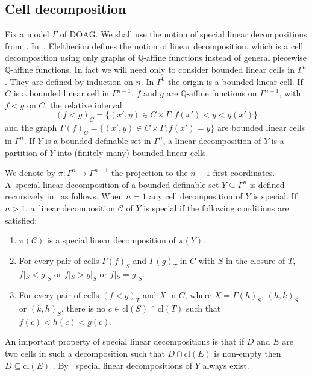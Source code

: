 \documentclass[10pt]{amsart}
\theoremstyle{definition}
\theoremstyle{remark}
\newcommand{\cl}{\mathrm{cl}}
\newcommand{\DOAG}{\mathrm{DOAG}}
\newcommand{\Q}{\mathbb Q}
\theoremstyle{plain}
\theoremstyle{definition}
\begin{document}
\subsection{Cell decomposition}
Fix a model $\Gamma$ of
$\DOAG$.
We shall use the notion
of special linear decompositions from~\cite{elef}. In~\cite{elef}, Eleftheriou defines the notion of linear decomposition, which is a cell decomposition using only
graphs of $\Q$-affine functions instead of general piecewise $\Q$-affine functions. In fact we will need only to consider bounded linear cells in $\Gamma^n$. They are defined by induction on $n$.
In $\Gamma^0$ the origin is a bounded linear cell. If $C$ is a bounded linear cell in $\Gamma^{n-1}$, $f$ and $g$ are $\Q$\nobreakdash-affine functions on $\Gamma^{n-1}$, with $f < g$ on $C$, the relative interval
\[
(f < g)_C = \{(x', y) \in C \times \Gamma; f (x') < y < g(x')\}
\]
and the graph $\Gamma (f)_C = \{(x', y) \in C \times \Gamma; f (x') = y\}$ are bounded linear cells in $\Gamma^n$.
If $Y$ is a bounded definable set in $\Gamma^n$, a linear decomposition of $Y$ is a partition of $Y$ into (finitely many) bounded linear cells.

We denote by $\pi: \Gamma^n \to \Gamma^{n-1}$ the projection to the $n-1$ first coordinates.
A~special linear decomposition of a bounded definable set $Y \subseteq \Gamma^n$ is defined recursively in~\cite{elef} as follows. When $n = 1$ any cell decomposition of $Y$ is special.
If $n > 1$, a~linear decomposition $\mathcal{C}$ of $Y$ is special if the following conditions are satisfied:\enlargethispage{\baselineskip}%
\begin{enumerate}
\item $\pi (\mathcal{C})$ is a special linear decomposition of $\pi (Y)$.
\item For every pair of cells $\Gamma (f)_S$ and $\Gamma (g)_T$ in $C$ with $S$ in the closure of $T$,
$f|_S <g|_S$ or $f|_S >g|_S$ or $f|_S =g|_S$.
\item\label{item3} For every pair of cells $(f<g)_T$ and $X$ in $C$, where $X = \Gamma (h)_S$, $(h,k)_S$ or $(k,h)_S$,
there is no $c \in \cl(S) \cap \cl(T)$ such that $f(c) < h(c) < g(c)$.
\end{enumerate}

An important property of special linear decompositions is that if $D$ and $E$ are two cells in such a decomposition such that
$D \cap \cl (E)$ is non-empty then $D \subseteq \cl (E)$ \cite[Fact 2.3]{elef}.
By~\cite[Fact 2.2]{elef} special linear decompositions of $Y$ always exist.
\end{document}
